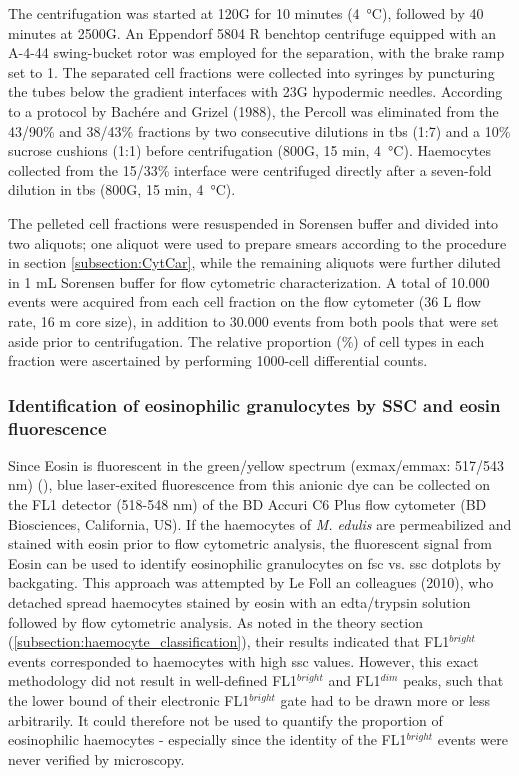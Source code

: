 The centrifugation was started at 120G for 10 minutes (\SI{4}{\celsius}), followed by 40 minutes at 2500G. An Eppendorf 5804 R benchtop centrifuge equipped with an A-4-44 swing-bucket rotor was employed for the separation, with the brake ramp set to 1. The separated cell fractions were collected into syringes by puncturing the tubes below the gradient interfaces with 23G hypodermic needles. According to a protocol by Bachére and Grizel (1988), the Percoll was eliminated from the 43/90\% and 38/43\% fractions by two consecutive dilutions in \acrshort{tbs} (1:7) and a 10\% sucrose cushions (1:1) before centrifugation (800G, 15 min, \SI{4}{\celsius}). Haemocytes collected from the 15/33\% interface were centrifuged directly after a seven-fold dilution in \acrshort{tbs} (800G, 15 min, \SI{4}{\celsius}).

The pelleted cell fractions were resuspended in Sorensen buffer and divided into two aliquots; one aliquot were used to prepare smears according to the procedure in section \ref{subsection:CytCar}, while the remaining aliquots were further diluted in 1 mL Sorensen buffer for flow cytometric characterization. A total of 10.000 events were acquired from each cell fraction on the flow cytometer (36 \micro L flow rate, 16 \micro m core size), in addition to 30.000 events from both pools that were set aside prior to centrifugation. The relative proportion (\%) of cell types in each fraction were ascertained by performing 1000-cell differential counts.

\subsubsection{Identification of eosinophilic granulocytes by SSC and eosin fluorescence}
Since Eosin is fluorescent in the green/yellow spectrum (\acrshort{exmax}/\acrshort{emmax}: 517/543 nm) (\cite{Koegle2020}), blue laser-exited fluorescence from this anionic dye can be collected on the FL1 detector (518-548 nm) of the BD Accuri C6 Plus flow cytometer (BD Biosciences, California, US). If the haemocytes of \emph{M. edulis} are permeabilized and stained with eosin prior to flow cytometric analysis, the fluorescent signal from Eosin can be used to identify eosinophilic granulocytes on \acrshort{fsc} vs. \acrshort{ssc} dotplots by backgating. This approach was attempted by Le Foll an colleagues (2010), who detached spread haemocytes stained by eosin with an \acrshort{edta}/trypsin solution followed by flow cytometric analysis. As noted in the theory section (\ref{subsection:haemocyte_classification}), their results indicated that FL1$^{bright}$ events corresponded to haemocytes with high \acrshort{ssc} values. However, this exact methodology did not result in well-defined FL1$^{bright}$ and FL1$^{dim}$ peaks, such that the lower bound of their electronic FL1$^{bright}$ gate had to be drawn more or less arbitrarily. It could therefore not be used to quantify the proportion of eosinophilic haemocytes - especially since the identity of the FL1$^{bright}$ events were never verified by microscopy.

